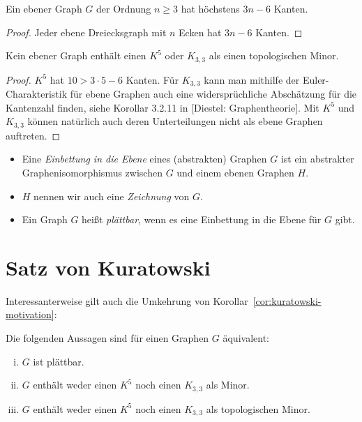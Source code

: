 \documentclass[10pt,b5paper]{article}
\begin{document}
\begin{corollary}
Ein ebener Graph $G$ der Ordnung $n\geq 3$ hat höchstens $3n-6$ Kanten.
\end{corollary}

\begin{proof}
Jeder ebene Dreiecksgraph mit $n$ Ecken hat $3n-6$ Kanten.
\end{proof}

\begin{corollary}\label{cor:kuratowski-motivation}
Kein ebener Graph enthält einen $K^5$ oder $K_{3,3}$ als einen topologischen Minor.
\end{corollary}

\begin{proof}
$K^5$ hat $10 > 3\cdot 5 - 6$ Kanten. Für $K_{3,3}$ kann man mithilfe der Euler-Charakteristik für ebene Graphen auch eine widersprüchliche Abschätzung für die Kantenzahl finden, siehe Korollar 3.2.11 in [Diestel: Graphentheorie]. Mit $K^5$ und $K_{3,3}$ können natürlich auch deren Unterteilungen nicht als ebene Graphen auftreten.
\end{proof}

\begin{proposition}
\begin{itemize}
\item Eine \textit{Einbettung in die Ebene} eines (abstrakten) Graphen $G$ ist ein abstrakter Graphenisomorphismus zwischen $G$ und einem ebenen Graphen $H$. 
\item $H$ nennen wir auch eine \textit{Zeichnung} von $G$.
\item Ein Graph $G$ heißt \textit{plättbar}, wenn es eine Einbettung in die Ebene für $G$ gibt.
\end{itemize}

\end{proposition}

\section{Satz von Kuratowski}

Interessanterweise gilt auch die Umkehrung von Korollar~\ref{cor:kuratowski-motivation}:

\begin{theorem}\label{thm:kuratowski}
Die folgenden Aussagen sind für einen Graphen $G$ äquivalent:
\begin{enumerate}[(i)]
\item $G$ ist plättbar.
\item  $G$ enthält weder einen $K^5$ noch einen $K_{3,3}$ als Minor.
\item  $G$ enthält weder einen $K^5$ noch einen $K_{3,3}$ als topologischen Minor.
\end{enumerate}
\end{theorem}
\end{document}
